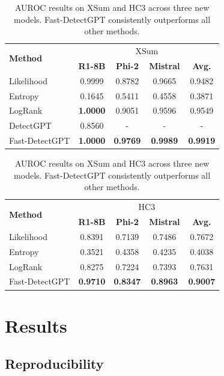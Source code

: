 \documentclass[11pt]{article}
\begin{document}
\begin{table}[h]
    \centering
    \small
    \begin{tabular}{l|ccc|c}
    \toprule
    \multirow{2}{*}{\textbf{Method}} & \multicolumn{4}{c}{XSum} \\
    \cmidrule{2-5}
    & \textbf{R1-8B} & \textbf{Phi-2} & \textbf{Mistral} & \textbf{Avg.} \\
    \midrule
    Likelihood & 0.9999 & 0.8782 & 0.9665 & 0.9482 \\
    Entropy & 0.1645 & 0.5411 & 0.4558 &  0.3871\\
    LogRank & \textbf{1.0000} & 0.9051 & 0.9596 & 0.9549 \\
    \midrule
    DetectGPT & 0.8560 & - & - & - \\
    Fast-DetectGPT & \textbf{1.0000} & \textbf{0.9769} & \textbf{0.9989} & \textbf{0.9919} \\
    \bottomrule
    \end{tabular}
    \vspace{0.5em}
    
    \begin{tabular}{l|ccc|c}
    \toprule
    \multirow{2}{*}{\textbf{Method}} & \multicolumn{4}{c}{HC3} \\
    \cmidrule{2-5}
    & \textbf{R1-8B} & \textbf{Phi-2} & \textbf{Mistral} & \textbf{Avg.} \\
    \midrule
    Likelihood & 0.8391 & 0.7139 & 0.7486 & 0.7672 \\
    Entropy & 0.3521 & 0.4358 & 0.4235 & 0.4038 \\
    LogRank & 0.8275 & 0.7224 & 0.7393 & 0.7631 \\
    \midrule
    Fast-DetectGPT & \textbf{0.9710} & \textbf{0.8347} & \textbf{0.8963} & \textbf{0.9007} \\
    \bottomrule
    \end{tabular}
    \vspace{0.5em}
    \caption{AUROC results on XSum and HC3 across three new models. Fast-DetectGPT consistently outperforms all other methods.}
    \label{tab:main_results}
\end{table}

\section{Results}

\subsection{Reproducibility}
\end{document}
